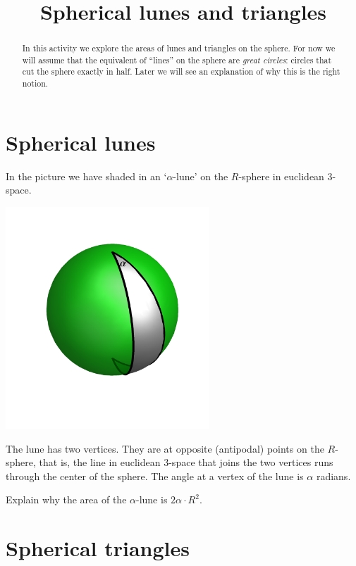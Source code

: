 \documentclass[newpage,hints,handout]{ximera}
\title{Spherical lunes and triangles}
\begin{document}
\begin{abstract}
In this activity we explore the areas of lunes and triangles on the sphere.
For now we will assume that the equivalent of ``lines'' on the sphere are
\emph{great circles}: circles that cut the sphere exactly in half.  Later we will
see an explanation of why this is the right notion.
\end{abstract}
\maketitle



\section{Spherical lunes}

In the picture we have shaded in an `$\alpha$-lune' on the $R$-sphere in
euclidean $3$-space.%
\begin{image}
\includegraphics[width=3in]{W13_3.png}%
\end{image}


The lune has two vertices. They are at opposite (antipodal) points on the
$R$-sphere, that is, the line in euclidean $3$-space that joins the two
vertices runs through the center of the sphere. The angle at a vertex of the
lune is $\alpha$ radians.

\begin{problem}
\label{67} Explain why the area of the $\alpha$-lune is $2\alpha
\cdot R^{2}$.
\end{problem}


\section{Spherical triangles}
\end{document}
